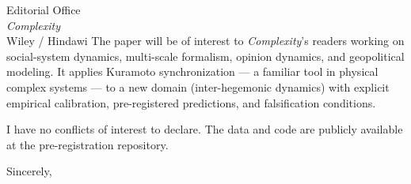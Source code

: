 \documentclass[12pt]{letter}
\begin{document}
\begin{letter}{Editorial Office\\
\textit{Complexity}\\
Wiley / Hindawi}
The paper will be of interest to \textit{Complexity}'s readers working on social-system dynamics, multi-scale formalism, opinion dynamics, and geopolitical modeling. It applies Kuramoto synchronization --- a familiar tool in physical complex systems --- to a new domain (inter-hegemonic dynamics) with explicit empirical calibration, pre-registered predictions, and falsification conditions.

I have no conflicts of interest to declare. The data and code are publicly available at the pre-registration repository.

\closing{Sincerely,}

\end{letter}
\end{document}
